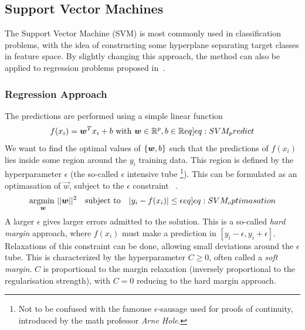         \subsection{Support Vector Machines}
            The Support Vector Machine (SVM) is most commonly used in classification problems, with the idea of constructing some hyperplane separating target classes in feature space. By slightly changing this approach, the method can also be applied to regression problems proposed in~\citep{SVR}. 
            
            \subsubsection{Regression Approach}
                The predictions are performed using a simple linear function
                \begin{align}
                    f(x_i) = \vec{w}^T x_i + b \text{ with } \vec{w} \in \mathbb{R}^p, b \in \mathbb{R} \label[eq]{eq:SVM_predict} 
                \end{align}
                We want to find the optimal values of $\{\boldsymbol{w}, b\}$ such that the predictions of $f(x_i)$ lies inside some region around the $y_i$ training data. This region is defined by the hyperparameter $\epsilon$ (the so-called $\epsilon$ intensive tube \footnote{Not to be confused with the famouse $\epsilon$-sausage used for proofs of continuity, introduced by the math professor \textit{Arne Hole}.}). This can be formulated as an optimasation of $\vec{w}$, subject to the $\epsilon$ constraint ~\citep{SVRgood}.  
                \begin{align}
                    \underset{\vec{w}}{\text{argmin  }}   ||\vec{w}||^2 
                    \hspace{10px}\text{subject to}\hspace{10px} |y_i - f(x_i)| \leq \epsilon \label[eq]{eq:SVM_optimasation}
                \end{align}
                A larger $\epsilon$ gives larger errors admitted to the solution. This is a so-called \textit{hard margin} approach, where $f(x_i)$ must make a prediction in $[y_i - \epsilon, y_i + \epsilon]$. Relaxations of this constraint can be done, allowing small deviations around the $\epsilon$ tube. This is characterized by the hyperparameter $C \geq 0$, often called a \textit{soft margin}. $C$ is proportional to the margin relaxation (inversely proportional to the regularisation strength), with $C = 0$ reducing to the hard margin approach.
            
